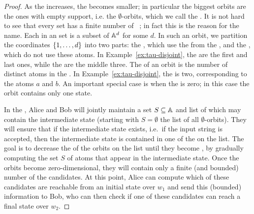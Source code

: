 \begin{proof}
\AP As the  increases, the  becomes smaller; in
particular the biggest orbits are the ones with empty support, i.e. the
$\emptyset$-orbits, which we call the . It is not
hard to see that every  set has a finite number of
~\cite[Lemma 1.4]{bojanczyk_slightly}; in fact this is
the reason for the name. Each  in an  set is a
subset of $\mathbb A^d$ for some $d$. In such an orbit, we partition the
coordinates $\{1,\ldots,d\}$ into two parts: the ,
which use the  from the , and the , which do not use these atoms. In Example~\ref{ex:tau-disjoint},
the  are  the first and last ones, while the  are the middle three. The  of an
orbit is the number of distinct atoms in the . In
Example~\ref{ex:tau-disjoint}, the  is two,
corresponding to the atoms $a$ and $b$. An important special case is when the
 is zero; in this case the orbit contains only one state.

In the , Alice and Bob will jointly maintain a set
$S \subseteq \mathbb A$ and list of  which may contain the
intermediate state (starting with $S = \emptyset$ the list of all
$\emptyset$-orbits). They will ensure that if the intermediate state exists,
i.e.~if the input string is accepted,  then the intermediate state is contained
in one of the  on the list. The goal is to decrease the  of the orbits on the list until they become
, by gradually computing the set $S$ of atoms that appear in
the intermediate state. Once the orbits become zero-dimensional, they will
contain only a finite (and bounded) number of the candidates. At this point,
Alice can compute which of these candidates are reachable from an initial state
over $w_1$ and send this (bounded) information to Bob, who can then check if
one of these candidates can reach a final state over $w_2$. 


\end{proof}
